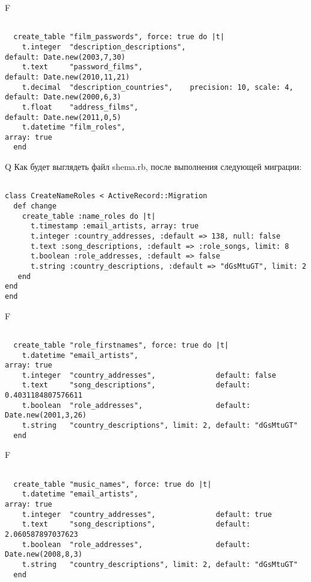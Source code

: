 F
\begin{verbatim}

  create_table "film_passwords", force: true do |t|
    t.integer  "description_descriptions",                          default: Date.new(2003,7,30)
    t.text     "password_films",                                    default: Date.new(2010,11,21)
    t.decimal  "description_countries",    precision: 10, scale: 4, default: Date.new(2000,6,3)
    t.float    "address_films",                                     default: Date.new(2011,0,5)
    t.datetime "film_roles",                                                                     array: true
  end

\end{verbatim}

Q
Как будет выглядеть файл shema.rb, после выполнения следующей миграции:

\begin{verbatim}

class CreateNameRoles < ActiveRecord::Migration 
  def change 
    create_table :name_roles do |t| 
      t.timestamp :email_artists, array: true
      t.integer :country_addresses, :default => 138, null: false
      t.text :song_descriptions, :default => :role_songs, limit: 8
      t.boolean :role_addresses, :default => false
      t.string :country_descriptions, :default => "dGsMtuGT", limit: 2
   end
end
end
\end{verbatim}

F
\begin{verbatim}

  create_table "role_firstnames", force: true do |t|
    t.datetime "email_artists",                                                      array: true
    t.integer  "country_addresses",              default: false
    t.text     "song_descriptions",              default: 0.4031184807576611
    t.boolean  "role_addresses",                 default: Date.new(2001,3,26)
    t.string   "country_descriptions", limit: 2, default: "dGsMtuGT"
  end

\end{verbatim}

F
\begin{verbatim}

  create_table "music_names", force: true do |t|
    t.datetime "email_artists",                                                      array: true
    t.integer  "country_addresses",              default: true
    t.text     "song_descriptions",              default: 2.060587897037623
    t.boolean  "role_addresses",                 default: Date.new(2008,8,3)
    t.string   "country_descriptions", limit: 2, default: "dGsMtuGT"
  end

\end{verbatim}

